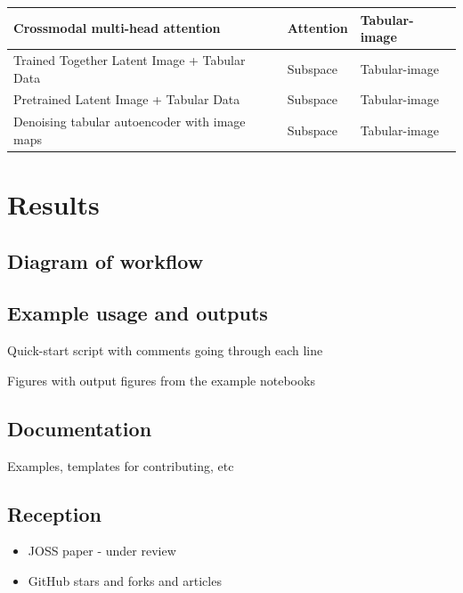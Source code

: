\begin{table}[!ht]
\begin{tabular}{|p{8cm}ll|}
        Crossmodal multi-head attention \cite{golovanevskyMultimodalAttentionbasedDeep2022} & Attention & Tabular-image \\ \hline 
        Trained Together Latent Image + Tabular Data \cite{zhaoMultimodalDeepLearning2022} & Subspace & Tabular-image \\ \hline 
        Pretrained Latent Image + Tabular Data \cite{zhaoMultimodalDeepLearning2022} & Subspace & Tabular-image \\ \hline 
        Denoising tabular autoencoder with image maps \cite{yanRicherFusionNetwork2021} & Subspace & Tabular-image \\ \hline
    \end{tabular}
\end{table}


\section{Results}




\subsection{Diagram of workflow}

\subsection{Example usage and outputs}
Quick-start script with comments going through each line

Figures with output figures from the example notebooks

\subsection{Documentation}
Examples, templates for contributing, etc


\subsection{Reception}
\begin{itemize}
    \item JOSS paper - under review 
    \item GitHub stars and forks and articles
\end{itemize}

